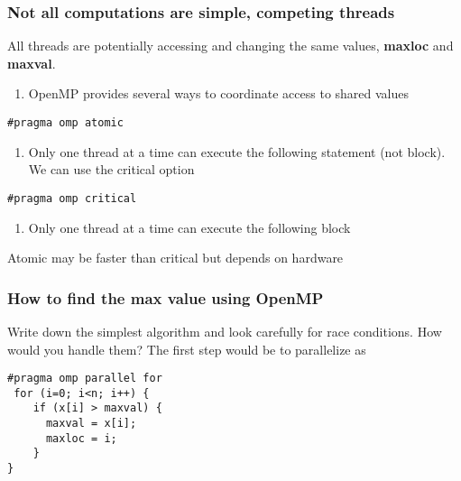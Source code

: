 \documentclass{beamer}
\begin{document}
\begin{frame}
\frametitle{Not all computations are simple, competing threads}

\begin{block}{}
All threads are potentially accessing and changing the same values, \textbf{maxloc} and \textbf{maxval}.
\begin{enumerate}
\item OpenMP provides several ways to coordinate access to shared values
\end{enumerate}

\noindent


\begin{verbatim}
#pragma omp atomic

\end{verbatim}

\begin{enumerate}
\item Only one thread at a time can execute the following statement (not block). We can use the critical option
\end{enumerate}

\noindent


\begin{verbatim}
#pragma omp critical

\end{verbatim}

\begin{enumerate}
\item Only one thread at a time can execute the following block
\end{enumerate}

\noindent
Atomic may be faster than critical but depends on hardware
\end{block}
\end{frame}

\begin{frame}
\frametitle{How to find the max value using OpenMP}

\begin{block}{}
Write down the simplest algorithm and look carefully for race conditions. How would you handle them? 
The first step would be to parallelize as 








\begin{verbatim}
#pragma omp parallel for
 for (i=0; i<n; i++) {
    if (x[i] > maxval) {
      maxval = x[i];
      maxloc = i; 
    }
}

\end{verbatim}

\end{block}
\end{frame}
\end{document}
